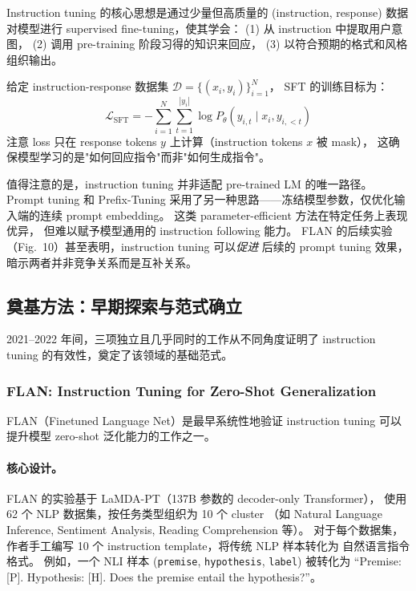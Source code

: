 \noindent
Instruction tuning 的核心思想是通过少量但高质量的 (instruction, response) 数据
对模型进行 supervised fine-tuning，使其学会：
(1) 从 instruction 中提取用户意图，
(2) 调用 pre-training 阶段习得的知识来回应，
(3) 以符合预期的格式和风格组织输出。

\begin{solutionbox}
给定 instruction-response 数据集 $\mathcal{D} = \{(x_i, y_i)\}_{i=1}^N$，
SFT 的训练目标为：
\[
  \mathcal{L}_{\text{SFT}} = -\sum_{i=1}^{N} \sum_{t=1}^{|y_i|}
    \log P_\theta(y_{i,t} \mid x_i, y_{i,<t})
\]
注意 loss 只在 response tokens $y$ 上计算（instruction tokens $x$ 被 mask），
这确保模型学习的是"如何回应指令"而非"如何生成指令"。
\end{solutionbox}


值得注意的是，instruction tuning 并非适配 pre-trained LM 的唯一路径。
Prompt tuning \citep{lester2021prompt} 和 Prefix-Tuning \citep{li2021prefix}
采用了另一种思路——冻结模型参数，仅优化输入端的连续 prompt embedding。
这类 parameter-efficient 方法在特定任务上表现优异，
但难以赋予模型通用的 instruction following 能力。
FLAN 的后续实验（Fig.~10）甚至表明，instruction tuning 可以\emph{促进}
后续的 prompt tuning 效果，暗示两者并非竞争关系而是互补关系。

\subsection{奠基方法：早期探索与范式确立}
\label{sec:t1-foundation}

2021--2022 年间，三项独立且几乎同时的工作从不同角度证明了
instruction tuning 的有效性，奠定了该领域的基础范式。


\subsubsection{FLAN: Instruction Tuning for Zero-Shot Generalization}
\label{sec:t1-flan}

FLAN（Finetuned Language Net）是最早系统性地验证
instruction tuning 可以提升模型 zero-shot 泛化能力的工作之一。

\paragraph{核心设计。}
FLAN 的实验基于 LaMDA-PT（137B 参数的 decoder-only Transformer），
使用 62 个 NLP 数据集，按任务类型组织为 10 个 cluster
（如 Natural Language Inference, Sentiment Analysis, Reading Comprehension 等）。
对于每个数据集，作者手工编写 10 个 instruction template，将传统 NLP 样本转化为
自然语言指令格式。
例如，一个 NLI 样本 (\texttt{premise}, \texttt{hypothesis}, \texttt{label})
被转化为 ``Premise: [P]. Hypothesis: [H]. Does the premise entail the hypothesis?''。

